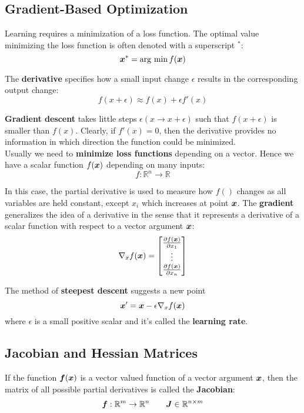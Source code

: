 \begin{multicols}{2}
	\subsection{Gradient-Based Optimization}
	Learning requires a minimization of a loss function. The optimal value minimizing the loss function is often denoted with a superscript $^\ast$:
	\[ \bol{x}^\ast = \arg\,\min f(\bol{x}) \]

	The \textbf{derivative} specifies how a small input change $\epsilon$ results in the corresponding output change:
	\[ f(x+\epsilon) \approx f(x) + \epsilon f'(x) \]

	\textbf{Gradient descent} takes little steps $\epsilon (x\rightarrow x+\epsilon)$ such that $f(x+\epsilon)$ is smaller than $f(x)$.
	Clearly, if $f'(x)=0$, then the derivative provides no information in which direction the function could be minimized.\\

	Usually we need to \textbf{minimize loss functions} depending on a vector.
	Hence we have a scalar function $f(\bol{x})$ depending on many inputs:
	\[ f:\mathbb{R}^n\rightarrow \mathbb{R} \]

	In this case, the partial derivative is used to measure how $f()$ changes as all variables are held constant, except $x_i$ which increases at point $\bol{x}$.
	The \textbf{gradient} generalizes the idea of a derivative in the sense that it represents a derivative of a scalar function with respect to a vector argument $\bol{x}$:
	\[ \nabla_x f(\bol{x}) =
	\begin{bmatrix} \frac{\partial f(\bol{x})}{\partial x_1}\\ \vdots \\ \frac{\partial f(\bol{x})}{\partial x_n} \end{bmatrix}  \]

	The method of \textbf{steepest descent} suggests a new point
	\[ \bol{x}' = \bol{x}-\epsilon\nabla_xf(\bol{x}) \]
	where $\epsilon$ is a small positive scalar and it's called the \textbf{learning rate}.

	\subsection{Jacobian and Hessian Matrices}
	If the function $\bol{f}(\bol{x})$ is a vector valued function of a vector argument $\bol{x}$, then the matrix of all possible partial derivatives is called the \textbf{Jacobian}:
	\[ \bol{f}:\mathbb{R}^m\rightarrow \mathbb{R}^n \qquad \bol{J}\in \mathbb{R}^{n\times m} \]


\end{multicols}
